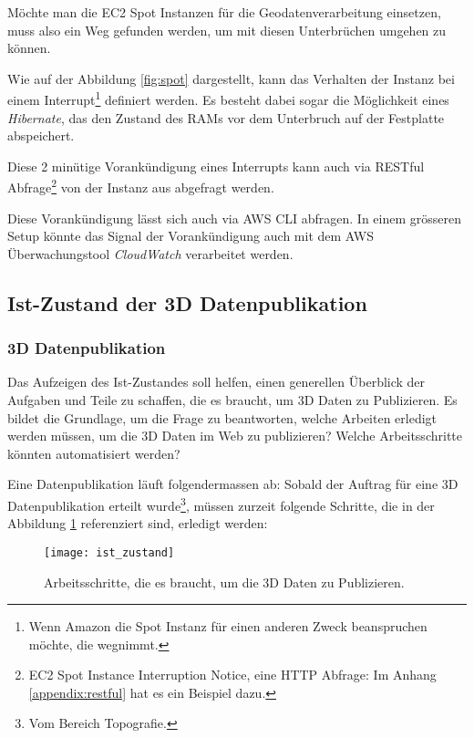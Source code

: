 Möchte man die EC2 Spot Instanzen für die Geodatenverarbeitung einsetzen, muss also ein Weg gefunden werden, um mit diesen Unterbrüchen umgehen zu können.

Wie auf der Abbildung \ref{fig:spot} dargestellt, kann das Verhalten der Instanz bei einem Interrupt\footnote{Wenn Amazon die Spot Instanz für einen anderen Zweck beanspruchen möchte, die wegnimmt.} definiert werden. Es besteht dabei sogar die Möglichkeit eines \emph{Hibernate}, das den Zustand des RAMs vor dem Unterbruch auf der Festplatte abspeichert.

Diese 2 minütige Vorankündigung eines Interrupts kann auch via RESTful Abfrage\footnote{EC2 Spot Instance Interruption Notice, eine HTTP Abfrage: Im Anhang \ref{appendix:restful} hat es ein Beispiel dazu.} von der Instanz aus abgefragt werden.

Diese Vorankündigung lässt sich auch via AWS CLI abfragen. In einem grösseren Setup könnte das Signal der Vorankündigung auch mit dem AWS Überwachungstool \emph{CloudWatch} verarbeitet werden.


\subsection{Ist-Zustand der 3D Datenpublikation}
\subsubsection{3D Datenpublikation}
Das Aufzeigen des Ist-Zustandes soll helfen, einen generellen Überblick der Aufgaben und Teile zu schaffen, die es braucht, um 3D Daten zu Publizieren. Es bildet die Grundlage, um die Frage zu beantworten, welche Arbeiten erledigt werden müssen, um die 3D Daten im Web zu publizieren? Welche Arbeitsschritte könnten automatisiert werden? 

Eine Datenpublikation läuft folgendermassen ab: Sobald der Auftrag für eine 3D Datenpublikation erteilt wurde\footnote{Vom Bereich Topografie.}, müssen zurzeit folgende Schritte, die in der Abbildung \ref{fig:ist_zustand} referenziert sind, erledigt werden:

\begin{figure}[H]
	\centering
	\texttt{[image: ist\_zustand]}
	\caption{Arbeitsschritte, die es braucht, um die 3D Daten zu Publizieren.}
	\label{fig:ist_zustand}
\end{figure}


